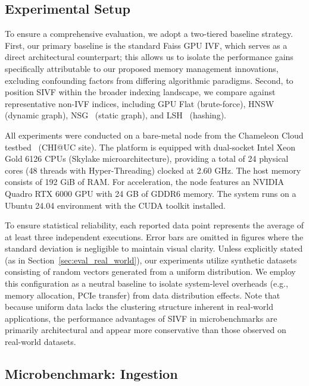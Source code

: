 \documentclass[sigconf,anonymous]{acmart}
\theoremstyle{plain}
\theoremstyle{definition}
\theoremstyle{remark}
\begin{document}
\subsection{Experimental Setup}
\label{sec:exp_setup}

To ensure a comprehensive evaluation, we adopt a two-tiered baseline strategy. 
First, our primary baseline is the standard Faiss GPU IVF, which serves as a direct architectural counterpart; this allows us to isolate the performance gains specifically attributable to our proposed memory management innovations, excluding confounding factors from differing algorithmic paradigms. 
Second, to position SIVF within the broader indexing landscape, we compare against representative non-IVF indices, including GPU Flat (brute-force), HNSW~\cite{malkov2018efficient} (dynamic graph), NSG~\cite{10.14778/3303753.3303754} (static graph), and LSH~\cite{10.1145/997817.997857} (hashing).

All experiments were conducted on a bare-metal node from the Chameleon Cloud testbed~\cite{keahey2020lessons} (CHI@UC site). The platform is equipped with dual-socket Intel Xeon Gold 6126 CPUs (Skylake microarchitecture), providing a total of 24 physical cores (48 threads with Hyper-Threading) clocked at 2.60 GHz. The host memory consists of 192 GiB of RAM. 
For acceleration, the node features an NVIDIA Quadro RTX 6000 GPU with 24 GB of GDDR6 memory. The system runs on a Ubuntu 24.04 environment with the CUDA toolkit installed.

To ensure statistical reliability, each reported data point represents the average of at least three independent executions. Error bars are omitted in figures where the standard deviation is negligible to maintain visual clarity. 
Unless explicitly stated (as in Section~\ref{sec:eval_real_world}), our experiments utilize synthetic datasets consisting of random vectors generated from a uniform distribution. We employ this configuration as a neutral baseline to isolate system-level overheads (e.g., memory allocation, PCIe transfer) from data distribution effects. Note that because uniform data lacks the clustering structure inherent in real-world applications, the performance advantages of SIVF in microbenchmarks are primarily architectural and appear more conservative than those observed on real-world datasets.

\subsection{Microbenchmark: Ingestion}
\label{sec:eval_add_performance}
\end{document}

